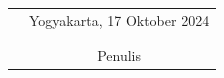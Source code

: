 \documentclass{skripsimathugm}
\begin{document}
\vspace{0.8cm}

\begin{tabular}{p{7cm}c}
&Yogyakarta, 17 Oktober 2024\\
&\\
&\\
&Penulis
\end{tabular}
\newpage{}
\makeatletter\renewcommand{}\makeatother
\begin{singlespacing}\tableofcontents\end{singlespacing}

\newpage{}
\begin{singlespacing}\listoftables\end{singlespacing}

\newpage{}
\begin{singlespacing}\listoffigures\end{singlespacing}
\end{document}
